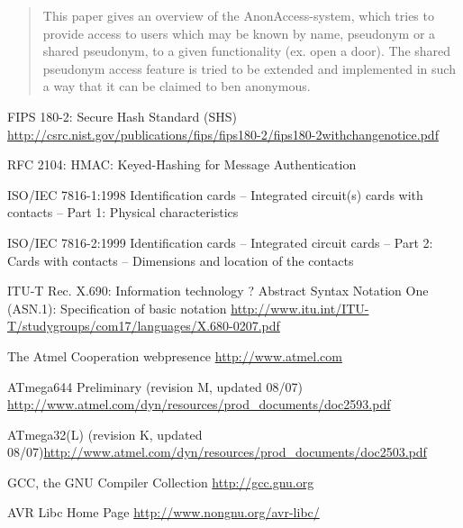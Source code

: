 \documentclass[10pt,a4paper]{article}
\begin{document}
\begin{abstract}
This paper gives an overview of the AnonAccess-system, which tries to provide access to users which may be known by name, pseudonym or a shared pseudonym, to a given functionality (ex. open a door). The shared pseudonym access feature is tried to be extended and implemented in such a way that it can be claimed to ben anonymous.
\end{abstract}






\begin{appendix}


\end{appendix}
 
\begin{thebibliography}{999}
 FIPS 180-2: Secure Hash Standard (SHS) \url{http://csrc.nist.gov/publications/fips/fips180-2/fips180-2withchangenotice.pdf}
 
 RFC 2104: HMAC: Keyed-Hashing for Message Authentication

 ISO/IEC 7816-1:1998 Identification cards -- Integrated circuit(s) cards with contacts -- Part 1: Physical characteristics

 ISO/IEC 7816-2:1999 Identification cards -- Integrated circuit cards -- Part 2: Cards with contacts -- Dimensions and location of the contacts

 ITU-T Rec. X.690: Information technology ? Abstract Syntax Notation One (ASN.1): Specification of basic notation \url{http://www.itu.int/ITU-T/studygroups/com17/languages/X.680-0207.pdf}

 The Atmel Cooperation webpresence \url{http://www.atmel.com}  

 ATmega644 Preliminary (revision M, updated 08/07) \url{http://www.atmel.com/dyn/resources/prod_documents/doc2593.pdf}

 ATmega32(L) (revision K, updated 08/07)\url{http://www.atmel.com/dyn/resources/prod_documents/doc2503.pdf}

 GCC, the GNU Compiler Collection \url{http://gcc.gnu.org}
 
 AVR Libc Home Page \url{http://www.nongnu.org/avr-libc/}
\end{thebibliography}
\end{document}
